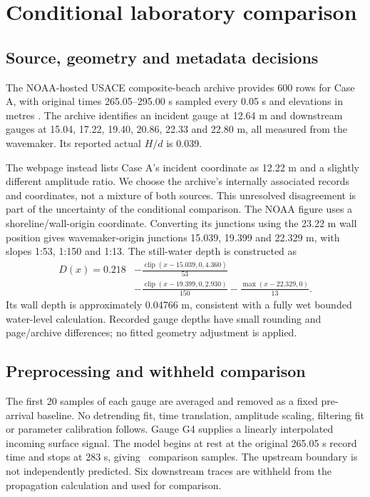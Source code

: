 \documentclass[11pt]{article}
\begin{document}
\section{Conditional laboratory comparison}\label{sec:lab}
\subsection{Source, geometry and metadata decisions}
The NOAA-hosted USACE composite-beach archive provides 600 rows for Case A,
with original times 265.05--295.00 s sampled every 0.05 s and elevations in
metres \cite{noaa}. The archive identifies an incident gauge at 12.64 m
and downstream gauges at 15.04, 17.22, 19.40, 20.86, 22.33 and 22.80 m,
all measured from the wavemaker. Its reported actual $H/d$ is 0.039.

The webpage instead lists Case A's incident coordinate as 12.22 m and a slightly
different amplitude ratio. We choose the archive's internally associated records
and coordinates, not a mixture of both sources. This unresolved disagreement
is part of the uncertainty of the conditional comparison.
The NOAA figure uses a shoreline/wall-origin coordinate. Converting its
junctions using the 23.22 m wall position gives wavemaker-origin junctions
15.039, 19.399 and 22.329 m, with slopes 1:53, 1:150 and 1:13.
The still-water depth is constructed as
\begin{align}
 D(x)=0.218&-\frac{\operatorname{clip}(x-15.039,0,4.360)}{53}\\
 &-\frac{\operatorname{clip}(x-19.399,0,2.930)}{150}
 -\frac{\max(x-22.329,0)}{13}.
\end{align}
Its wall depth is approximately 0.04766 m, consistent with a fully wet
bounded water-level calculation. Recorded gauge depths have small rounding
and page/archive differences; no fitted geometry adjustment is applied.

\subsection{Preprocessing and withheld comparison}
The first 20 samples of each gauge are averaged and removed as a fixed
pre-arrival baseline. No detrending fit, time translation, amplitude scaling,
filtering fit or parameter calibration follows. Gauge G4 supplies a linearly
interpolated incoming surface signal. The model begins at rest at the original
265.05 s record time and stops at 283 s, giving \LabSamples\ comparison samples.
The upstream boundary is not independently predicted. Six downstream traces
are withheld from the propagation calculation and used for comparison.
\end{document}
